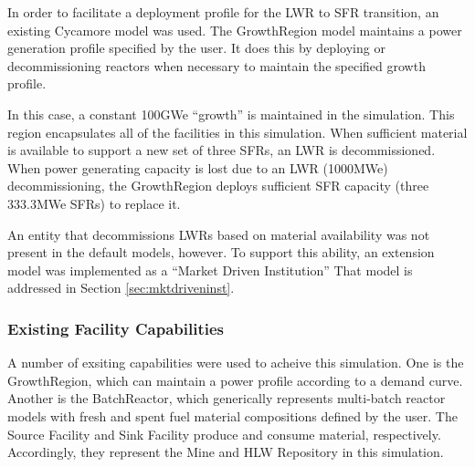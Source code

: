 In order to facilitate a deployment profile for the \gls{LWR} to \gls{SFR} transition, an 
existing Cycamore model was used. The GrowthRegion model maintains a 
power generation profile specified by the user. It does this by deploying or 
decommissioning reactors when necessary to maintain the specified growth 
profile.  

In this case, a constant 100GWe ``growth'' is maintained in the simulation. 
This region encapsulates all of the facilities in this simulation. 
When sufficient material is available to support a new set of three SFRs, an 
LWR is decommissioned. When power generating capacity is lost due to an LWR 
(1000MWe) decommissioning, the GrowthRegion deploys sufficient SFR capacity 
(three 333.3MWe SFRs) to replace it. 

An entity that decommissions LWRs based on material availability was not 
present in the default models, however. To support this ability, an extension 
model was implemented as a ``Market Driven Institution'' That model is 
addressed in Section \ref{sec:mktdriveninst}.

\subsubsection{Existing Facility Capabilities}

A number of exsiting capabilities were used to acheive this simulation. One is
the GrowthRegion, which can maintain a power profile according to a demand
curve. Another is the BatchReactor, which generically represents multi-batch 
reactor
models with fresh and spent fuel material compositions defined by the user. The
Source Facility and Sink Facility produce and consume material, respectively.
Accordingly, they represent the Mine and HLW Repository in this simulation.

